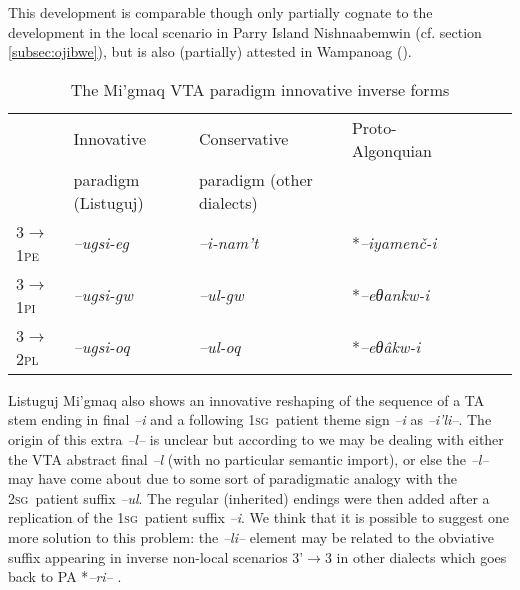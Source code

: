 \documentclass[twoside,a4paper,11pt]{article}
\newcommand{\ipa}[1]{{\phon\textit{#1}}}
\newcommand{\sg}{\textsc{sg}}
\newcommand{\pl}{\textsc{pl}}
\newcommand{\grise}[1]{\cellcolor{lightgray}\textbf{#1}}
\newcommand{\Σ}{\greek{Σ}}
\newcommand{\pli}{\textsc{pi}}
\newcommand{\pe}{\textsc{pe}}
\begin{document}
This development is comparable though only partially cognate to the development in the local scenario in Parry Island Nishnaabemwin (cf. section \ref{subsec:ojibwe}), but is also (partially) attested in Wampanoag (\citealp[556]{bragdon}).

\begin{table}[H]
\caption{The Mi'gmaq VTA paradigm innovative inverse forms}
\centering \label{tab:migmaq.vta.innov}
\begin{tabular}{lllllll}
\toprule
& Innovative & Conservative & Proto-Algonquian \\
&paradigm (Listuguj) & paradigm (other dialects) &\\
\midrule
3$\rightarrow$1\pe & 	\ipa{--ugsi-eg} \grise{}& 	\ipa{--i-nam't} &  *\ipa{--iyamenč-i} & 		\\
\textsc{3$\rightarrow$1\pli} & 	\ipa{--ugsi-gw} \grise{}& 	\ipa{--ul-gw}  &*\ipa{--eθankw-i} & 		\\
\midrule
3$\rightarrow$2\pl & \ipa{--ugsi-oq} \grise{}& 	\ipa{--ul-oq} & *\ipa{--eθâkw-i} & 		\\
\bottomrule
\end{tabular}
\end{table}

Listuguj Mi'gmaq also shows an innovative reshaping of the sequence of a TA stem ending in final \ipa{--i} and a following 1\sg\ patient theme sign \ipa{--i} as \ipa{--i'li--}. The origin of this extra \ipa{--l--} is unclear but according to \cite{Quinn12} we may be dealing with either the VTA abstract final \ipa{--l} (with no particular semantic import), or else the \ipa{--l--} may have come about due to some sort of paradigmatic analogy with the 2\sg\ patient suffix \ipa{--ul}. The regular (inherited) endings were then added after a replication of the 1\sg\ patient suffix \ipa{--i}. We think that it is possible to suggest one more solution to this problem: the \ipa{--li--} element may be related to the obviative suffix appearing in inverse non-local scenarios 3'$\rightarrow$3 in other dialects which goes back to PA *\ipa{--ri--} .
\end{document}
